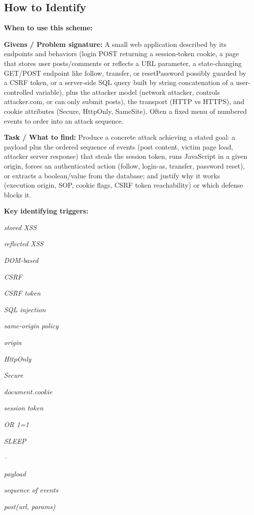 \documentclass[12pt, a4paper]{article}
\begin{document}
\subsection*{How to Identify}

\textbf{When to use this scheme:}

\textbf{Givens / Problem signature:}
A small web application described by its endpoints and behaviors (login POST returning a session-token cookie, a page that stores user posts/comments or reflects a URL parameter, a state-changing GET/POST endpoint like follow, transfer, or resetPassword possibly guarded by a CSRF token, or a server-side SQL query built by string concatenation of a user-controlled variable), plus the attacker model (network attacker, controls attacker.com, or can only submit posts), the transport (HTTP vs HTTPS), and cookie attributes (Secure, HttpOnly, SameSite).
Often a fixed menu of numbered events to order into an attack sequence.

\textbf{Task / What to find:}
Produce a concrete attack achieving a stated goal: a payload plus the ordered sequence of events (post content, victim page load, attacker server response) that steals the session token, runs JavaScript in a given origin, forces an authenticated action (follow, login-as, transfer, password reset), or extracts a boolean/value from the database; and justify why it works (execution origin, SOP, cookie flags, CSRF token reachability) or which defense blocks it.

\textbf{Key identifying triggers:}
\begin{tightitem}
        \item \textit{stored XSS}
        \item \textit{reflected XSS}
        \item \textit{DOM-based}
        \item \textit{CSRF}
        \item \textit{CSRF token}
        \item \textit{SQL injection}
        \item \textit{same-origin policy}
        \item \textit{origin}
        \item \textit{HttpOnly}
        \item \textit{Secure}
        \item \textit{document.cookie}
        \item \textit{session token}
        \item \textit{OR 1=1}
        \item \textit{SLEEP}
        \item \textit{--}
        \item \textit{payload}
        \item \textit{sequence of events}
        \item \textit{post(url, params)}
    \end{tightitem}
\end{document}
